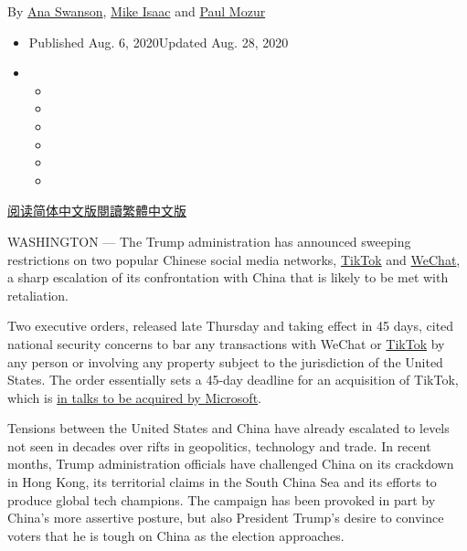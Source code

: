 By \href{https://www.nytimes3xbfgragh.onion/by/ana-swanson}{Ana
Swanson}, \href{https://www.nytimes3xbfgragh.onion/by/mike-isaac}{Mike
Isaac} and \href{https://www.nytimes3xbfgragh.onion/by/paul-mozur}{Paul
Mozur}

\begin{itemize}
\item
  Published Aug. 6, 2020Updated Aug. 28, 2020
\item
  \begin{itemize}
  \item
  \item
  \item
  \item
  \item
  \item
  \end{itemize}
\end{itemize}

\href{https://cn.nytimes3xbfgragh.onion/usa/20200807/trump-wechat-tiktok-china/}{阅读简体中文版}\href{https://cn.nytimes3xbfgragh.onion/usa/20200807/trump-wechat-tiktok-china/zh-hant/}{閱讀繁體中文版}

WASHINGTON --- The Trump administration has announced sweeping
restrictions on two popular Chinese social media networks,
\href{https://www.nytimes3xbfgragh.onion/2020/08/28/technology/tiktok-walmart-ecommerce.html}{TikTok}
and
\href{https://www.nytimes3xbfgragh.onion/2020/09/04/technology/wechat-china-united-states.html}{WeChat},
a sharp escalation of its confrontation with China that is likely to be
met with retaliation.

Two executive orders, released late Thursday and taking effect in 45
days, cited national security concerns to bar any transactions with
WeChat or
\href{https://www.nytimes3xbfgragh.onion/2020/08/28/technology/microsoft-tiktok-lobbying.html}{TikTok}
by any person or involving any property subject to the jurisdiction of
the United States. The order essentially sets a 45-day deadline for an
acquisition of TikTok, which is
\href{https://www.nytimes3xbfgragh.onion/2020/08/03/technology/trump-tiktok-microsoft.html}{in
talks to be acquired by Microsoft}.

Tensions between the United States and China have already escalated to
levels not seen in decades over rifts in geopolitics, technology and
trade. In recent months, Trump administration officials have challenged
China on its crackdown in Hong Kong, its territorial claims in the South
China Sea and its efforts to produce global tech champions. The campaign
has been provoked in part by China's more assertive posture, but also
President Trump's desire to convince voters that he is tough on China as
the election approaches.

